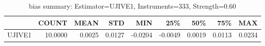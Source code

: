 \begin{table}[ht]
\centering
\caption{bias summary: Estimator=UJIVE1, Instruments=333, Strength=0.60}
\begin{tabular}{lrrrrrrrr}
\toprule
 & COUNT & MEAN & STD & MIN & 25\% & 50\% & 75\% & MAX \\
\midrule
UJIVE1 & 10.0000 & 0.0025 & 0.0127 & -0.0204 & -0.0049 & 0.0019 & 0.0113 & 0.0234 \\
\bottomrule
\end{tabular}
\end{table}
